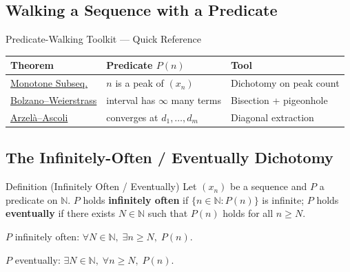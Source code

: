 
\subsection{Walking a Sequence with a Predicate}
\label{sec:predicate-walking}

\begin{toolkitbox}{Predicate-Walking Toolkit --- Quick Reference}
\small
\begin{tabular}{l l l}
\toprule
\textbf{Theorem}  & \textbf{Predicate $P(n)$}  & \textbf{Tool} \\
\midrule
\hyperref[thm:monotone-subsequence]{Monotone Subseq.}
   & $n$ is a peak of $(x_n)$
   & Dichotomy on peak count
  \\[3pt]
\hyperref[prop:bw-bisection]{Bolzano--Weierstrass}
   & interval has $\infty$ many terms
   & Bisection + pigeonhole
  \\[3pt]
\hyperref[rem:arzela-ascoli]{Arzel\`a--Ascoli}
   & converges at $d_1,\ldots,d_m$
   & Diagonal extraction
  \\
\bottomrule
\end{tabular}
\end{toolkitbox}

\subsection*{The Infinitely-Often / Eventually Dichotomy}
\label{subsec:io-ev-dichotomy}

\begin{definitionbox}{Definition (Infinitely Often / Eventually)}
\label{def:inf-often-eventually}
Let $(x_n)$ be a sequence and $P$ a predicate on $\mathbb{N}$. $P$ holds
\textbf{infinitely often} if $\{n\in\mathbb{N}:P(n)\}$ is infinite; $P$
holds \textbf{eventually} if there exists $N\in\mathbb{N}$ such that
$P(n)$ holds for all $n\geq N$.
\end{definitionbox}

\begin{remark}
$P$ infinitely often: $\forall N\in\mathbb{N},\;\exists n\geq N,\;P(n)$.

$P$ eventually: $\exists N\in\mathbb{N},\;\forall n\geq N,\;P(n)$.
\end{remark}

